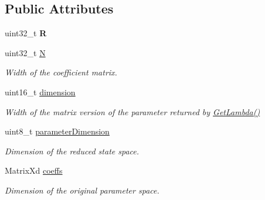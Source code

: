 \subsection*{Public Attributes}
\begin{DoxyCompactItemize}
\item 
\hypertarget{struct_d_r_d_s_p_1_1_affine_parameter_map_a7c4c0f072f5248a9c5cf65b813fcb836}{uint32\-\_\-t {\bfseries R}}\label{struct_d_r_d_s_p_1_1_affine_parameter_map_a7c4c0f072f5248a9c5cf65b813fcb836}

\item 
\hypertarget{struct_d_r_d_s_p_1_1_affine_parameter_map_a5f12477a00c6f104a97b240cb5a81295}{uint32\-\_\-t \hyperlink{struct_d_r_d_s_p_1_1_affine_parameter_map_a5f12477a00c6f104a97b240cb5a81295}{N}}\label{struct_d_r_d_s_p_1_1_affine_parameter_map_a5f12477a00c6f104a97b240cb5a81295}

\begin{DoxyCompactList}\small\item\em Width of the coefficient matrix. \end{DoxyCompactList}\item 
\hypertarget{struct_d_r_d_s_p_1_1_affine_parameter_map_aed859f95d6b7ea0850f84242df5379ab}{uint16\-\_\-t \hyperlink{struct_d_r_d_s_p_1_1_affine_parameter_map_aed859f95d6b7ea0850f84242df5379ab}{dimension}}\label{struct_d_r_d_s_p_1_1_affine_parameter_map_aed859f95d6b7ea0850f84242df5379ab}

\begin{DoxyCompactList}\small\item\em Width of the matrix version of the parameter returned by \hyperlink{struct_d_r_d_s_p_1_1_affine_parameter_map_ae983bda2073bac0d8e6aebcc34d51153}{Get\-Lambda()} \end{DoxyCompactList}\item 
\hypertarget{struct_d_r_d_s_p_1_1_affine_parameter_map_a210acc8ae8c11b4b2c9360e42ccafb00}{uint8\-\_\-t \hyperlink{struct_d_r_d_s_p_1_1_affine_parameter_map_a210acc8ae8c11b4b2c9360e42ccafb00}{parameter\-Dimension}}\label{struct_d_r_d_s_p_1_1_affine_parameter_map_a210acc8ae8c11b4b2c9360e42ccafb00}

\begin{DoxyCompactList}\small\item\em Dimension of the reduced state space. \end{DoxyCompactList}\item 
\hypertarget{struct_d_r_d_s_p_1_1_affine_parameter_map_a760993390cbbec42011c1e1e76a44660}{Matrix\-Xd \hyperlink{struct_d_r_d_s_p_1_1_affine_parameter_map_a760993390cbbec42011c1e1e76a44660}{coeffs}}\label{struct_d_r_d_s_p_1_1_affine_parameter_map_a760993390cbbec42011c1e1e76a44660}

\begin{DoxyCompactList}\small\item\em Dimension of the original parameter space. \end{DoxyCompactList}\end{DoxyCompactItemize}


